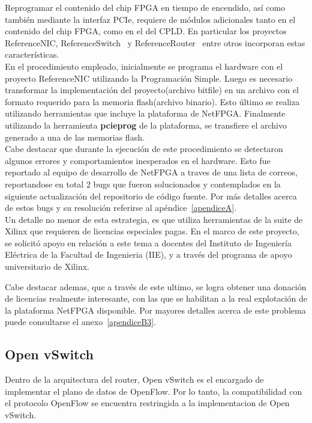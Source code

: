 Reprogramar el contenido del chip FPGA en tiempo de encendido, así como también mediante la interfaz PCIe, requiere de módulos adicionales tanto en el contenido del chip FPGA, como en el del CPLD. En particular los proyectos ReferenceNIC, ReferenceSwitch~\citep{ReferenceSwitchProject} y ReferenceRouter~\citep{ReferenceRouterProject} entre otros incorporan estas características.\\

En el procedimiento empleado, inicialmente se programa el hardware con el proyecto ReferenceNIC utilizando la Programaci\'on Simple. Luego es necesario transformar la implementaci\'on del proyecto(archivo bitfile) en un archivo con el formato requerido para la memoria flash(archivo binario). Esto \'ultimo se realiza utilizando herramientas que incluye la plataforma de NetFPGA. Finalmente utilizando la herramienta \textbf{pcieprog} de la plataforma, se transfiere el archivo generado a una de las memorias flash.\\

Cabe destacar que durante la ejecuci\'on de este procedimiento se detectaron algunos errores y comportamientos inesperados en el hardware. Esto fue reportado al equipo de desarrollo de NetFPGA a traves de una lista de correos, reportandose en total 2 bugs que fueron solucionados y contemplados en la siguiente actualizaci\'on del repositorio de c\'odigo fuente. Por m\'as detalles acerca de estos bugs y su resoluci\'on referirse al ap\'endice~\ref{apendiceA}.\\

Un detalle no menor de esta estrategia, es que utiliza herramientas de la suite de Xilinx que requieren de licencias especiales pagas. En el marco de este proyecto, se solicit\'o apoyo en relaci\'on a este tema a docentes del Instituto de Ingeniería Eléctrica de la Facultad de Ingenieria (IIE), y a través del programa de apoyo universitario de Xilinx. 

Cabe destacar ademas, que a través de este ultimo, se logra obtener una donación de licencias realmente interesante, con las que se habilitan a la real explotación de la plataforma NetFPGA disponible. Por mayores detalles acerca de este problema puede consultarse el anexo~\ref{apendiceB3}.\\

\subsection{Open vSwitch}
Dentro de la arquitectura del router, Open vSwitch es el encargado de implementar el plano de datos de OpenFlow. Por lo tanto, la compatibilidad con el protocolo OpenFlow se encuentra restringida a la implementacion de Open vSwitch.\\


